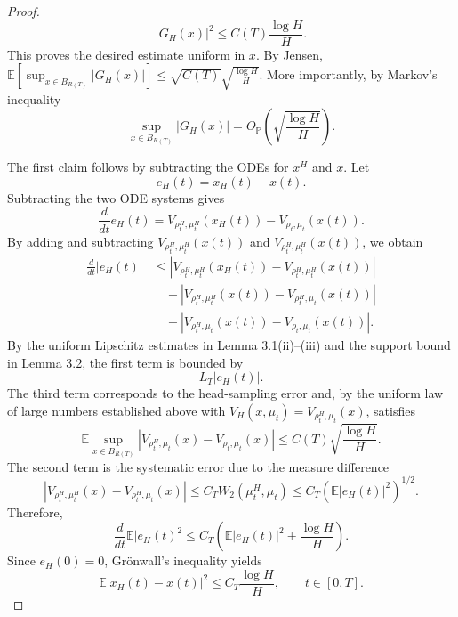 \documentclass[11pt,a4wide]{article}
\theoremstyle{definition}
\begin{document}
\begin{proof}
\[|G_H(x)|^2
\leq
C(T)\frac{\log H}{H}.
\]
This proves the desired  estimate uniform in $x.$  By Jensen, $\mathbb{E}
\left[ \sup_{x\in B_{R(T)}}
|G_H(x)| \right] 
\leq 
\sqrt{C(T)} \sqrt{\frac{\log H}{H}}$.  More importantly, by Markov's inequality 
$$
\sup_{x\in B_{R(T)}}
|G_H(x)| =O_{\mathbb P}\left(  \sqrt{\frac{\log H}{H}} \right). 
$$

The first claim follows by subtracting the ODEs for $x^H$ and $x$.
Let
\[
e_H(t)=x_H(t)-x(t).
\]
Subtracting the two ODE systems gives
\[
\frac{d}{dt}e_H(t)
=
V_{\rho^H_t,\mu^H_t}(x_H(t))
-
V_{\rho_t,\mu_t}(x(t)).
\]
By adding and subtracting
$V_{\rho^H_t,\mu^H_t}(x(t))$ and 
$V_{\rho^H_t,\mu^H_t}(x(t))$, we obtain
\begin{align*}
\frac{d}{dt}|e_H(t)|
&\leq
\left|
V_{\rho^H_t,\mu^H_t}(x_H(t))
-
V_{\rho^H_t,\mu^H_t}(x(t))
\right|  \\
&\quad+
\left|
V_{\rho^H_t,\mu^H_t}(x(t))
-
V_{\rho^H_t,\mu_t}(x(t))
\right| \\
&\quad+
\left|
V_{\rho^H_t,\mu_t}(x(t))
-
V_{\rho_t,\mu_t}(x(t))
\right|.
\end{align*}
By the uniform Lipschitz estimates in Lemma 3.1(ii)--(iii) and the support bound in Lemma 3.2,
the first term is bounded by
\[
L_T|e_H(t)|.
\]
The third term corresponds to the head-sampling error and, by the uniform law of large numbers established above with $V_H(x, \mu_t)=V_{\rho_t^H, \mu_t}(x)$, satisfies
\[
\mathbb{E}
\sup_{x\in B_{R(T)}}
\left|
V_{\rho^H_t,\mu_t}(x)
-
V_{\rho_t,\mu_t}(x)
\right|
\leq
C(T)\sqrt{\frac{\log H}{H}} .
\]
The second term is the systematic error due to the measure difference 
\[
\left|
V_{\rho^H_t,\mu^H_t}(x)
-
V_{\rho^H_t,\mu_t}(x)
\right|
\leq
C_T W_2(\mu^H_t,\mu_t)
\leq
C_T (\mathbb{E}|e_H(t)|^2)^{1/2}.
\]
Therefore,
\[
\frac{d}{dt}\mathbb{E}|e_H(t)^2 
\leq
C_T\left (\mathbb{E}|e_H(t)|^2 +
\frac{\log H}{H}\right).
\]
Since $e_H(0)=0$, Gr\"onwall's inequality yields
\[
\mathbb{E}|x_H(t)-x(t)|^2
\leq
C_T \frac{\log H}{H},
\qquad t\in[0,T].
\]

\end{proof}
 
\end{document}
